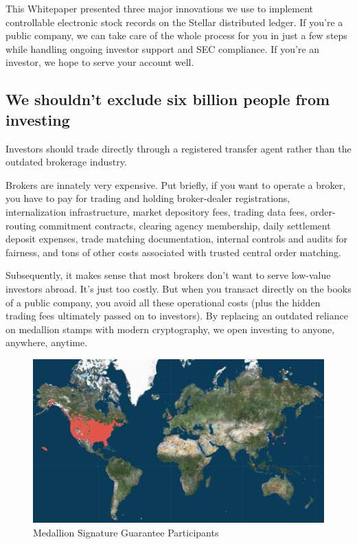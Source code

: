 \documentclass[11pt, english]{article}
\begin{document}
\begin{multicols}{2}
This Whitepaper presented three major innovations we use to implement controllable electronic stock records on the Stellar distributed ledger. If you're a public company, we can take care of the whole process for you in just a few steps while handling ongoing investor support and SEC compliance. If you're an investor, we hope to serve your account well.


\subsection{We shouldn't exclude six billion people from investing}

Investors should trade directly through a registered transfer agent rather than the outdated brokerage industry. 

Brokers are innately very expensive. Put briefly, if you want to operate a broker, you have to pay for trading and holding broker-dealer registrations, internalization infrastructure, market depository fees, trading data fees, order-routing commitment contracts, clearing agency membership, daily settlement deposit expenses, trade matching documentation, internal controls and audits for fairness, and tons of other costs associated with trusted central order matching.

Subsequently, it makes sense that most brokers don't want to serve low-value investors abroad. It's just too costly. But when you transact directly on the books of a public company, you avoid all these operational costs (plus the hidden trading fees ultimately passed on to investors). By replacing an outdated reliance on medallion stamps with modern cryptography, we open investing to anyone, anywhere, anytime.

\end{multicols}

\begin{figure}[H]
    \centering
    \includegraphics[width=420pt]{imgs/msg-map.jpg}
    \caption{Medallion Signature Guarantee Participants \cite{MSG_2022}}
\end{figure}
\end{document}
